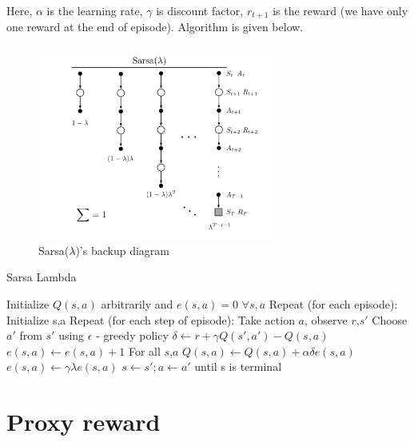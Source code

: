 Here, $\alpha$ is the learning rate, $\gamma$ is discount factor, $r_{t+1}$ is the reward (we have only 
one reward at the end of episode). Algorithm is given below.


\begin{figure}[!htb]
    \centering
    \includegraphics[width=0.7\textwidth]{backup_sarsa}
    \caption{ Sarsa($\lambda$)'s backup diagram }
    \label{image-myimage20}
\end{figure}

\begin{algorithm}[H]
\caption{ Sarsa Lambda }
\begin{algorithmic}
\State Initialize $Q(s,a)$ arbitrarily and $e(s,a) = 0$ $\forall s,a$
\State Repeat (for each episode):
\State \;\;\;\;\;\;Initialize s,a    
\State \;\;\;\;\;\;Repeat (for each step of episode):
\State \;\;\;\;\;\;\;\;\;\;\;\; Take action $a$, observe $r$,$s'$
\State \;\;\;\;\;\;\;\;\;\;\;\; Choose $a'$ from $s'$ using $\epsilon$ - greedy policy
\State \;\;\;\;\;\;\;\;\;\;\;\; $\delta \gets r + \gamma Q(s',a') - Q(s,a)$
\State \;\;\;\;\;\;\;\;\;\;\;\; $e(s,a) \gets e(s,a) + 1$
\State \;\;\;\;\;\;\;\;\;\;\;\; For all $s$,$a$
\State \;\;\;\;\;\;\;\;\;\;\;\;\;\;\;\;\;\; $Q(s,a) \gets Q(s,a) + \alpha \delta e(s,a)$
\State \;\;\;\;\;\;\;\;\;\;\;\;\;\;\;\;\;\; $e(s,a) \gets \gamma \lambda e(s,a)$
\State \;\;\;\;\;\;\;\;\;\;\;\; $s \gets s'; a \gets a'$
\State \;\;\;\;\;\; until s is terminal
\end{algorithmic}
\end{algorithm}


\vspace{1.0in}
\section{Proxy reward}

